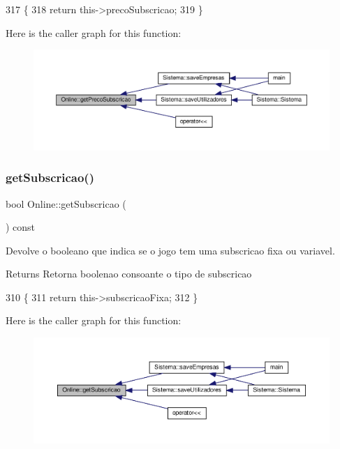 \begin{DoxyCode}
317  \{
318      \textcolor{keywordflow}{return} this->precoSubscricao;
319  \}
\end{DoxyCode}
Here is the caller graph for this function\+:
\nopagebreak
\begin{figure}[H]
\begin{center}
\leavevmode
\includegraphics[width=350pt]{classOnline_a0f7240aa5582e10579d0719e4fa5d705_icgraph}
\end{center}
\end{figure}
\mbox{\label{classOnline_aa222489df5a1e6bcfbf5e01d95178850}} 
\subsubsection{\texorpdfstring{get\+Subscricao()}{getSubscricao()}}
{\footnotesize\ttfamily bool Online\+::get\+Subscricao (\begin{DoxyParamCaption}{ }\end{DoxyParamCaption}) const}



Devolve o booleano que indica se o jogo tem uma subscricao fixa ou variavel. 

\begin{DoxyReturn}{Returns}
Retorna boolenao consoante o tipo de subscricao 
\end{DoxyReturn}

\begin{DoxyCode}
310  \{
311      \textcolor{keywordflow}{return} this->subscricaoFixa;
312  \}
\end{DoxyCode}
Here is the caller graph for this function\+:
\nopagebreak
\begin{figure}[H]
\begin{center}
\leavevmode
\includegraphics[width=350pt]{classOnline_aa222489df5a1e6bcfbf5e01d95178850_icgraph}
\end{center}
\end{figure}
\mbox{\label{classOnline_a3c0b8d3393271eabfa702629c979fb93}} 
